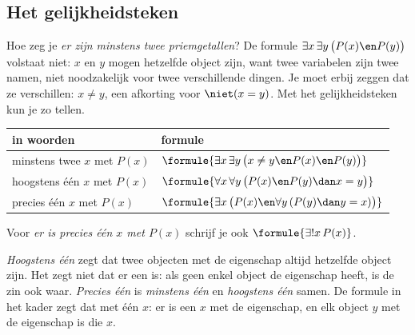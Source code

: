 
\begin{oefeningen}
\end{oefeningen}

\subsection{Het gelijkheidsteken}\label{sec:h1-gelijk}

Hoe zeg je \textit{er zijn minstens twee priemgetallen}? De formule $\exists x\, \exists y\, \bigl(P(x) \en P(y)\bigr)$ volstaat niet: $x$ en $y$ mogen hetzelfde object zijn, want twee variabelen zijn twee namen, niet noodzakelijk voor twee verschillende dingen. Je moet erbij zeggen dat ze verschillen: $x \neq y$, een afkorting voor $\niet(x = y)$. Met het gelijkheidsteken kun je zo tellen.

\begin{theorie}
{\centering{}\renewcommand{\arraystretch}{1.5}%
\begin{tabular}{|>{\centering\arraybackslash}m{4.4cm}|>{\centering\arraybackslash}m{8.4cm}|}
\hline
\textbf{in woorden} & \textbf{formule} \\ \hline
minstens twee $x$ met $P(x)$ & $\formule{\exists x\, \exists y\, \bigl(x \neq y \en P(x) \en P(y)\bigr)}$ \\ \hline
hoogstens één $x$ met $P(x)$ & $\formule{\forall x\, \forall y\, \bigl(P(x) \en P(y) \dan x = y\bigr)}$ \\ \hline
precies één $x$ met $P(x)$ & $\formule{\exists x\, \bigl(P(x) \en \forall y\, (P(y) \dan y = x)\bigr)}$ \\ \hline
\end{tabular}\par}

\vspace{1mm}
Voor \textit{er is precies één $x$ met $P(x)$} schrijf je ook $\formule{\exists! x\, P(x)}$.
\end{theorie}

\textit{Hoogstens één} zegt dat twee objecten met de eigenschap altijd hetzelfde object zijn. Het zegt niet dat er een is: als geen enkel object de eigenschap heeft, is de zin ook waar. \textit{Precies één} is \textit{minstens één} en \textit{hoogstens één} samen. De formule in het kader zegt dat met één $x$: er is een $x$ met de eigenschap, en elk object $y$ met de eigenschap is die $x$.

